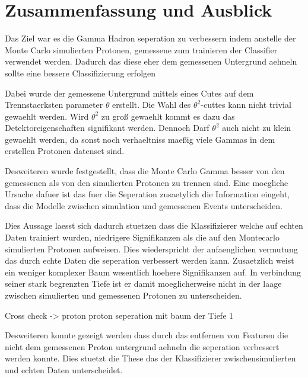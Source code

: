 \chapter{Zusammenfassung und Ausblick}
Das Ziel war es die Gamma Hadron seperation zu verbessern indem anstelle der Monte Carlo simulierten Protonen, gemessene zum trainieren der Classifier verwendet werden. 
Dadurch das diese eher dem gemessenen Untergrund aehneln sollte eine bessere Classifizierung erfolgen

Dabei wurde der gemessene Untergrund mittels eines Cutes auf dem Trennstaerksten parameter $\theta$ erstellt. 
Die Wahl des $\theta^{2}$-cuttes kann nicht trivial gewaehlt werden. 
Wird $\theta^{2}$ zu groß gewaehlt kommt es dazu das Detektoreigenschaften signifikant werden. 
Dennoch Darf $\theta^{2}$ auch nicht zu klein gewaehlt werden, da sonst noch verhaeltniss maeßig viele Gammas in dem erstellen Protonen datenset sind.

Desweiteren wurde festgestellt, dass die Monte Carlo Gamma besser von den gemessenen als von den simulierten Protonen zu trennen sind. 
Eine moegliche Ursache dafuer ist das fuer die Seperation zusaetylich die Information eingeht, dass die Modelle zwischen simulation und gemessenen Events unterscheiden.

Dies Aussage laesst sich dadurch stuetzen dass die Klassifizierer welche auf echten Daten trainiert wurden, niedrigere Signifikanzen als die auf den Montecarlo simulierten Protonen aufweisen. Dies wiederspricht der anfaenglichen vermutung das durch echte Daten die seperation verbessert werden kann. Zusaetzlich weist ein weniger komplexer Baum wesentlich hoehere Signifikanzen auf. In verbindung seiner stark begrenzten Tiefe ist er damit moeglicherweise nicht in der laage zwischen simulierten und gemessenen Protonen zu unterscheiden. 

Cross check 
-> proton proton seperation mit baum der Tiefe 1

Desweiteren konnte gezeigt werden dass durch das entfernen von Featuren die nicht dem gemessenen Proton untergrund aehneln die seperation verbessert werden konnte. Dies stuetzt die These das der Klassifizierer zwischensimulierten und echten Daten unterscheidet.
